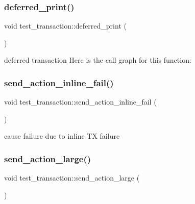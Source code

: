 \subsubsection{\texorpdfstring{deferred\+\_\+print()}{deferred\_print()}}
{\footnotesize\ttfamily void test\+\_\+transaction\+::deferred\+\_\+print (\begin{DoxyParamCaption}{ }\end{DoxyParamCaption})\hspace{0.3cm}{\ttfamily [static]}}

deferred transaction Here is the call graph for this function\+:
\mbox{\label{structtest__transaction_a69f3404b21d3bfb5e1647c0003f6a8aa}} 
\subsubsection{\texorpdfstring{send\+\_\+action\+\_\+inline\+\_\+fail()}{send\_action\_inline\_fail()}}
{\footnotesize\ttfamily void test\+\_\+transaction\+::send\+\_\+action\+\_\+inline\+\_\+fail (\begin{DoxyParamCaption}{ }\end{DoxyParamCaption})\hspace{0.3cm}{\ttfamily [static]}}

cause failure due to inline TX failure \mbox{\label{structtest__transaction_a2d42f72c8017592fd46f82cfe630e6bf}} 
\subsubsection{\texorpdfstring{send\+\_\+action\+\_\+large()}{send\_action\_large()}}
{\footnotesize\ttfamily void test\+\_\+transaction\+::send\+\_\+action\+\_\+large (\begin{DoxyParamCaption}{ }\end{DoxyParamCaption})\hspace{0.3cm}{\ttfamily [static]}}

